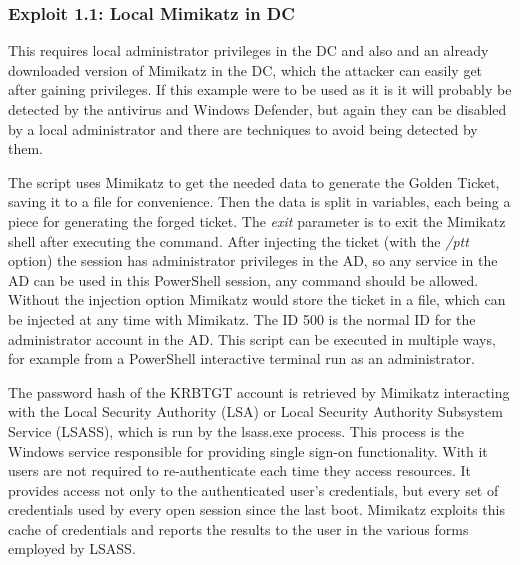\subsubsection{Exploit 1.1: Local Mimikatz in DC}
This requires local administrator privileges in the DC and also and an already downloaded version of Mimikatz in the DC, which the attacker can easily get after gaining privileges. If this example were to be used as it is it will probably be detected by the antivirus and Windows Defender, but again they can be disabled by a local administrator and there are techniques to avoid being detected by them.
\linej

\linej
The script uses Mimikatz to get the needed data to generate the Golden Ticket, saving it to a file for convenience. Then the data is split in variables, each being a piece for generating the forged ticket. The \textit{exit} parameter is to exit the Mimikatz shell after executing the command.
\linej
After injecting the ticket (with the \textit{/ptt} option) the session has administrator privileges in the AD, so any service in the AD can be used in this PowerShell session, any command should be allowed. Without the injection option Mimikatz would store the ticket in a file, which can be injected at any time with Mimikatz.
The ID 500 is the normal ID for the administrator account in the AD.
This script can be executed in multiple ways, for example from a PowerShell interactive terminal run as an administrator.
\linej

\linej
The password hash of the KRBTGT account is retrieved by Mimikatz interacting with the Local Security Authority (LSA) or Local Security Authority Subsystem Service (LSASS), which is run by the lsass.exe process.
\linej
This process is the Windows service responsible for providing single sign-on functionality.
With it users are not required to re-authenticate each time they access resources.
It provides access not only to the authenticated user's credentials, but every set of credentials used by every open session since the last boot\cite{wikipedia_lsass}\cite{dump_ways}.
\linej
Mimikatz exploits this cache of credentials and reports the results to the user in the various forms employed by LSASS\cite{SANS_mimikatz}\cite{pentestlab}.

